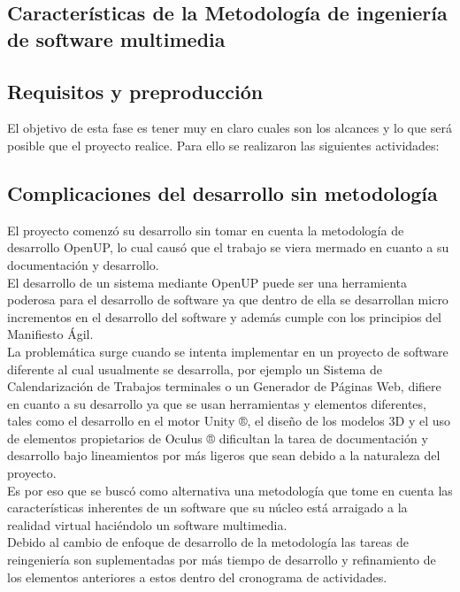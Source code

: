   \subsection{Características de la Metodología de ingeniería de software multimedia}
  \subsection{Requisitos y preproducción}
  El objetivo de esta fase es tener muy en claro cuales son los alcances y lo que será posible que el proyecto realice. Para ello se  realizaron las siguientes actividades:\\


\subsection{Complicaciones del desarrollo sin metodología}
El proyecto comenzó su desarrollo sin tomar en cuenta la metodología de desarrollo OpenUP, lo cual causó que el trabajo se viera mermado en cuanto a su documentación y desarrollo.\\
El desarrollo de un sistema mediante OpenUP puede ser una herramienta poderosa para el desarrollo de software ya que dentro de ella se desarrollan micro incrementos en el desarrollo del software y además cumple con los principios del Manifiesto Ágil\cite{beck2001manifesto}.\\
La problemática surge cuando se intenta implementar en un proyecto de software diferente al cual usualmente se desarrolla, por ejemplo un Sistema de Calendarización de Trabajos terminales o un Generador de Páginas Web, difiere en cuanto a su desarrollo ya que se usan herramientas y elementos diferentes, tales como el desarrollo en el motor Unity ®, el diseño de los modelos 3D y el uso de elementos propietarios de Oculus ® dificultan la tarea de documentación y desarrollo bajo lineamientos por más ligeros que sean debido a la naturaleza del proyecto.\\
Es por eso que se buscó como alternativa una metodología que tome en cuenta las características inherentes de un software que su núcleo está arraigado a la realidad virtual haciéndolo un software multimedia.\\
Debido al cambio de enfoque de desarrollo de la metodología las tareas de reingeniería son suplementadas por más tiempo de desarrollo y refinamiento de los elementos anteriores a estos dentro del cronograma de actividades.\\

